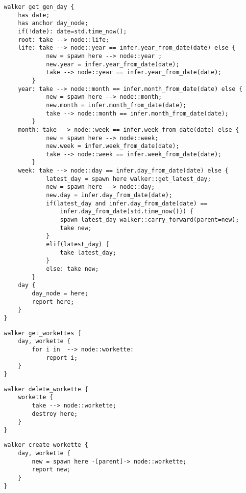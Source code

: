 \begin{lstlisting}[caption={Get day if present otherwise create day}]
walker get_gen_day {
    has date;
    has anchor day_node;
    if(!date): date=std.time_now();
    root: take --> node::life;
    life: take --> node::year == infer.year_from_date(date) else {
            new = spawn here --> node::year ;
            new.year = infer.year_from_date(date);
            take --> node::year == infer.year_from_date(date);
        }
    year: take --> node::month == infer.month_from_date(date) else {
            new = spawn here --> node::month;
            new.month = infer.month_from_date(date);
            take --> node::month == infer.month_from_date(date);
        }
    month: take --> node::week == infer.week_from_date(date) else {
            new = spawn here --> node::week;
            new.week = infer.week_from_date(date);
            take --> node::week == infer.week_from_date(date);
        }
    week: take --> node::day == infer.day_from_date(date) else {
            latest_day = spawn here walker::get_latest_day;
            new = spawn here --> node::day;
            new.day = infer.day_from_date(date);
            if(latest_day and infer.day_from_date(date) ==
                infer.day_from_date(std.time_now())) {
                spawn latest_day walker::carry_forward(parent=new);
                take new;
            }
            elif(latest_day) {
                take latest_day;
            }
            else: take new;
        }
    day {
        day_node = here;
        report here;
    }
}
\end{lstlisting}


\begin{lstlisting}[caption={Get child workettes}]
walker get_workettes {
    day, workette {
        for i in  --> node::workette:
            report i;
    }
}
\end{lstlisting}


\begin{lstlisting}[caption={Delete a workette and it's children}]
walker delete_workette {
    workette {
        take --> node::workette;
        destroy here;
    }
}
\end{lstlisting}


\begin{lstlisting}[caption={Create a child workette}]
walker create_workette {
    day, workette {
        new = spawn here -[parent]-> node::workette;
        report new;
    }
}
\end{lstlisting}


